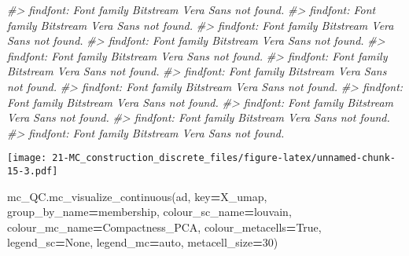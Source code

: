 \documentclass[
]{book}
\newenvironment{Shaded}{\begin{snugshade}}{\end{snugshade}}
\newcommand{\CommentTok}[1]{\textcolor[rgb]{0.56,0.35,0.01}{\textit{#1}}}
\newcommand{\DecValTok}[1]{\textcolor[rgb]{0.00,0.00,0.81}{#1}}
\newcommand{\NormalTok}[1]{#1}
\newcommand{\OperatorTok}[1]{\textcolor[rgb]{0.81,0.36,0.00}{\textbf{#1}}}
\newcommand{\StringTok}[1]{\textcolor[rgb]{0.31,0.60,0.02}{#1}}
\newcommand{\VariableTok}[1]{\textcolor[rgb]{0.00,0.00,0.00}{#1}}
\begin{document}
\begin{Shaded}
\begin{Highlighting}[]
\CommentTok{\#\textgreater{} findfont: Font family \textquotesingle{}Bitstream Vera Sans\textquotesingle{} not found.}
\CommentTok{\#\textgreater{} findfont: Font family \textquotesingle{}Bitstream Vera Sans\textquotesingle{} not found.}
\CommentTok{\#\textgreater{} findfont: Font family \textquotesingle{}Bitstream Vera Sans\textquotesingle{} not found.}
\CommentTok{\#\textgreater{} findfont: Font family \textquotesingle{}Bitstream Vera Sans\textquotesingle{} not found.}
\CommentTok{\#\textgreater{} findfont: Font family \textquotesingle{}Bitstream Vera Sans\textquotesingle{} not found.}
\CommentTok{\#\textgreater{} findfont: Font family \textquotesingle{}Bitstream Vera Sans\textquotesingle{} not found.}
\CommentTok{\#\textgreater{} findfont: Font family \textquotesingle{}Bitstream Vera Sans\textquotesingle{} not found.}
\CommentTok{\#\textgreater{} findfont: Font family \textquotesingle{}Bitstream Vera Sans\textquotesingle{} not found.}
\CommentTok{\#\textgreater{} findfont: Font family \textquotesingle{}Bitstream Vera Sans\textquotesingle{} not found.}
\CommentTok{\#\textgreater{} findfont: Font family \textquotesingle{}Bitstream Vera Sans\textquotesingle{} not found.}
\CommentTok{\#\textgreater{} findfont: Font family \textquotesingle{}Bitstream Vera Sans\textquotesingle{} not found.}
\CommentTok{\#\textgreater{} findfont: Font family \textquotesingle{}Bitstream Vera Sans\textquotesingle{} not found.}
\end{Highlighting}
\end{Shaded}

\texttt{[image: 21-MC\_construction\_discrete\_files/figure-latex/unnamed-chunk-15-3.pdf]}

\begin{Shaded}
\begin{Highlighting}[]
             
\NormalTok{mc\_QC.mc\_visualize\_continuous(ad, key}\OperatorTok{=}\StringTok{\textquotesingle{}X\_umap\textquotesingle{}}\NormalTok{, group\_by\_name}\OperatorTok{=}\StringTok{\textquotesingle{}membership\textquotesingle{}}\NormalTok{, }
\NormalTok{             colour\_sc\_name}\OperatorTok{=}\StringTok{\textquotesingle{}louvain\textquotesingle{}}\NormalTok{,  colour\_mc\_name}\OperatorTok{=}\StringTok{\textquotesingle{}Compactness\_PCA\textquotesingle{}}\NormalTok{, colour\_metacells}\OperatorTok{=}\VariableTok{True}\NormalTok{, }
\NormalTok{             legend\_sc}\OperatorTok{=}\VariableTok{None}\NormalTok{, legend\_mc}\OperatorTok{=}\StringTok{\textquotesingle{}auto\textquotesingle{}}\NormalTok{, metacell\_size}\OperatorTok{=}\DecValTok{30}\NormalTok{)   }
\end{Highlighting}
\end{Shaded}
\end{document}
